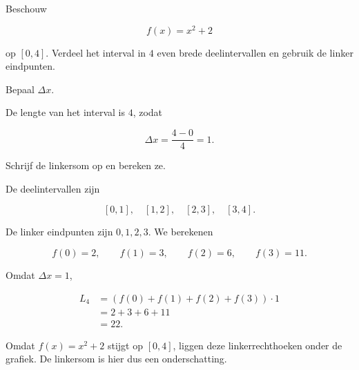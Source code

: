 \documentclass{ximera}
\begin{document}

\begin{oefening}{\oefB\ESS}

Beschouw

\[
f(x)=x^2+2
\]

op \([0,4]\). Verdeel het interval in \(4\) even brede deelintervallen
en gebruik de linker eindpunten.

\begin{question}
Bepaal \(\Delta x\).

\begin{oplossing}
De lengte van het interval is \(4\), zodat

\[
\Delta x=\frac{4-0}{4}=\boxed{1}.
\]
\end{oplossing}
\end{question}

\begin{question}
Schrijf de linkersom op en bereken ze.

\begin{oplossing}
De deelintervallen zijn

\[
[0,1],\quad [1,2],\quad [2,3],\quad [3,4].
\]

De linker eindpunten zijn \(0,1,2,3\). We berekenen

\[
f(0)=2,\qquad
f(1)=3,\qquad
f(2)=6,\qquad
f(3)=11.
\]

Omdat \(\Delta x=1\),

\[
\begin{aligned}
L_4
&=
\left(f(0)+f(1)+f(2)+f(3)\right)\cdot1\\
&=2+3+6+11\\
&=\boxed{22}.
\end{aligned}
\]

Omdat \(f(x)=x^2+2\) stijgt op \([0,4]\), liggen deze
linkerrechthoeken onder de grafiek. De linkersom is hier dus een
onderschatting.
\end{oplossing}
\end{question}

\end{oefening}


\end{document}
